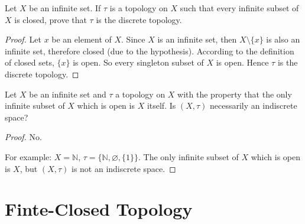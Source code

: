 \begin{exercise}
    Let $X$ be an infinite set. If $\tau$ is a topology on $X$ such that every infinite subset of $X$ is closed, prove that $\tau$ is the discrete topology.
\end{exercise}

\begin{proof}
    Let $x$ be an element of $X$. Since $X$ is an infinite set, then $X\setminus\{ x \}$ is also an infinite set, therefore closed (due to the hypothesis). According to the definition of closed sets, $\{ x \}$ is open. So every singleton subset of $X$ is open. Hence $\tau$ is the discrete topology.
\end{proof}
\newpage

\begin{exercise}
    Let $X$ be an infinite set and $\tau$ a topology on $X$ with the property that the only infinite subset of $X$ which is open is $X$ itself. Is $(X, \tau)$ necessarily an indiscrete space?
\end{exercise}

\begin{proof}
    No.

    For example: $X = \mathbb{N}$, $\tau = \{ \mathbb{N}, \varnothing, \{ 1 \} \}$. The only infinite subset of $X$ which is open is $X$, but $(X, \tau)$ is not an indiscrete space.
\end{proof}
\newpage

\section{Finte-Closed Topology}

